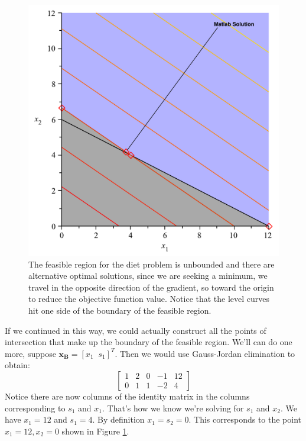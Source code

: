\begin{example}
\begin{figure}
\centering
\includegraphics[scale=0.35]{DietProblemFigure.pdf}
\caption{The feasible region for the diet problem is unbounded and there are alternative optimal solutions, since we are seeking a minimum, we travel in the opposite direction of the gradient, so toward the origin to reduce the objective function value. Notice that the level curves hit one side of the boundary of the feasible region.}
\label{fig:DietProblem}
\end{figure}
If we continued in this way, we could actually construct all the points of intersection that make up the boundary of the feasible region. We'll can do one more, suppose $\mathbf{x}_\mathbf{B} = [x_1\;\;s_1]^T$. Then we would use Gauss-Jordan elimination to obtain:
\begin{displaymath}\left[
\begin{array}{cccc|c}
1 & 2 & 0 & -1 & 12\\
0 & 1 & 1 & -2 & 4
\end{array}\right]
\end{displaymath}
Notice there are now columns of the identity matrix in the columns corresponding to $s_1$ and $x_1$. That's how we know we're solving for $s_1$ and $x_2$. We have $x_1 = 12$ and $s_1 = 4$. By definition $x_1 = s_2 = 0$. This corresponds to the point $x_1 = 12, x_2 = 0$ shown in Figure \ref{fig:DietProblem}.


\end{example}
